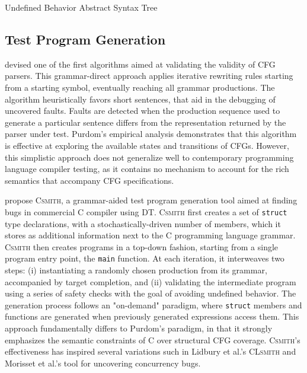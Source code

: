  {Undefined Behavior}
 {Abstract Syntax Tree}

\subsection{\label{subsec:tpg}Test Program Generation}

\citet{purdom1972sentence} devised one of the first algorithms aimed at
validating the validity of \gls{CFG} parsers.
This grammar-direct approach applies iterative rewriting rules
starting from a starting symbol, eventually reaching all grammar productions.
The algorithm heuristically favors short sentences, that aid in the
debugging of uncovered faults.
Faults are detected when the production sequence used to generate a particular
sentence differs from the representation returned by the parser under test.
Purdom's \cite{purdom1972sentence} empirical analysis demonstrates
that this algorithm is effective at exploring the available
states and transitions of \gls{CFG}s.
However, this simplistic approach does not generalize
well to contemporary programming language compiler testing,
as it contains no mechanism to account for the rich semantics
that accompany \gls{CFG} specifications.

\citet{yang2011finding} propose \textsc{Csmith}, a grammar-aided
test program generation tool aimed at finding bugs in commercial 
C compiler using \gls{DT}.
\textsc{Csmith} first creates a set of \texttt{struct} type
declarations, with a stochastically-driven  number of members, which 
it stores as additional information next to the C programming language grammar.
\textsc{Csmith} then creates programs in a top-down fashion, starting from a
single program entry point, the \texttt{main} function.
At each iteration, it interweaves two steps: (i) instantiating
a randomly chosen production from its grammar, accompanied
by target completion, and (ii) validating the intermediate program
using a series of safety checks with the goal of avoiding undefined behavior.
The generation process follows an "on-demand" paradigm, where \texttt{struct}
members and functions are generated when previously generated expressions
access them.
This approach fundamentally differs to Purdom's \cite{purdom1972sentence} paradigm,
in that it strongly emphasizes the semantic constraints of C over 
structural \gls{CFG} coverage.
\textsc{Csmith}'s effectiveness has inspired several variations such in
Lidbury et al.'s \textsc{CLsmith} \cite{lidbury2015many} and
Morisset et al.'s \cite{morisset2013compiler} tool for uncovering
concurrency bugs.

